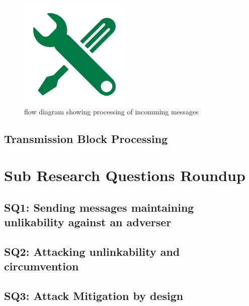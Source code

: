 \begin{figure}[ht]
	\includegraphics[width=\textwidth]{inc/fixme}
	\caption{flow diagram showing processing of incomming messages}
	\label{fig:msgRecvProcessing}
\end{figure}


\subsection{Transmission Block Processing}

\section{Sub Research Questions Roundup}
\subsection{SQ1: Sending messages maintaining unlikability against an adverser}
\subsection{SQ2: Attacking unlinkability and circumvention}
\subsection{SQ3: Attack Mitigation by design}

